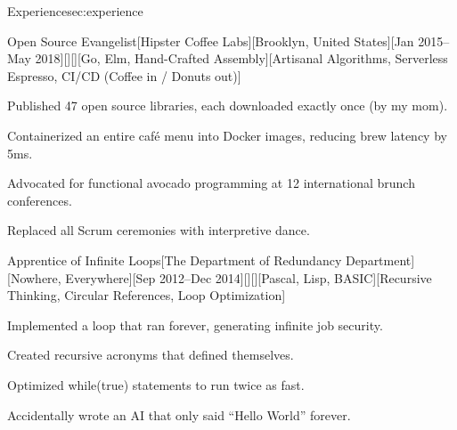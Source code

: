\documentclass[10pt, letterpaper, extended ]{i-am-developer}
\begin{document}
\begin{devCVSection}{Experience}{sec:experience}
  \begin{devRole}{Open Source Evangelist}[Hipster Coffee
    Labs][Brooklyn, United States][Jan 2015--May
    2018][\faCoffee][\faMapMarker][Go, Elm, Hand-Crafted
    Assembly][Artisanal Algorithms, Serverless Espresso, CI/CD
    (Coffee in / Donuts out)]
    \begin{devItemize}
    \item Published 47 open source libraries, each downloaded exactly
      once (by my mom).
    \item Containerized an entire café menu into Docker images,
      reducing brew latency by 5ms.
    \item Advocated for functional avocado programming at 12
      international brunch conferences.
    \item Replaced all Scrum ceremonies with interpretive dance.
    \end{devItemize}
  \end{devRole}

  \begin{devRole}{Apprentice of Infinite Loops}[The Department of
    Redundancy Department][Nowhere, Everywhere][Sep 2012--Dec
    2014][\faToilet][\faMapMarker][Pascal, Lisp, BASIC][Recursive
    Thinking, Circular References, Loop Optimization]
    \begin{devItemize}
    \item Implemented a loop that ran forever, generating infinite job security.
    \item Created recursive acronyms that defined themselves.
    \item Optimized while(true) statements to run twice as fast.
    \item Accidentally wrote an AI that only said “Hello World” forever.
    \end{devItemize}
  \end{devRole}
\end{devCVSection}
\end{document}
